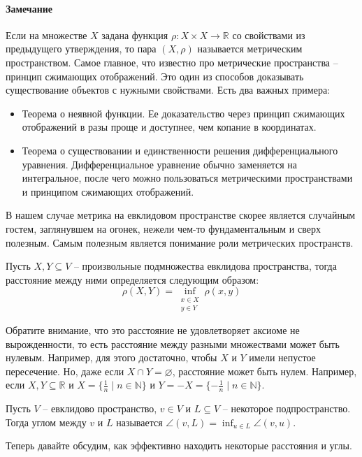 \paragraph{Замечание}

Если на множестве $X$ задана функция $\rho\colon X\times X\to \mathbb R$ со свойствами из предыдущего утверждения, то пара $(X,\rho)$ называется метрическим пространством. Самое главное, что известно про метрические пространства -- принцип сжимающих отображений. Это один из способов доказывать существование объектов с  нужными свойствами. Есть два важных примера:
\begin{itemize}
\item Теорема о неявной функции. Ее доказательство через принцип сжимающих отображений в разы проще и доступнее, чем копание в координатах.
\item Теорема о существовании и единственности решения дифференциального уравнения. Дифференциальное уравнение обычно заменяется на интегральное, после чего можно пользоваться метрическими пространствами и принципом сжимающих отображений.
\end{itemize}
В нашем случае метрика на евклидовом пространстве скорее является случайным гостем, заглянувшем на огонек, нежели чем-то фундаментальным и сверх полезным. Самым полезным является понимание роли метрических пространств.

\begin{definition}
Пусть $X,Y\subseteq V$ -- произвольные подмножества евклидова пространства, тогда расстояние между ними определяется следующим образом:
\[
\rho(X, Y) = \inf_{\substack{x\in X\\y\in Y}}\rho(x, y)
\]
\end{definition}
Обратите внимание, что это расстояние не удовлетворяет аксиоме не вырожденности, то есть расстояние между разными множествами может быть нулевым. Например, для этого достаточно, чтобы $X$ и $Y$ имели непустое пересечение. Но, даже если $X\cap Y = \varnothing$, расстояние может быть нулем. Например, если $X, Y \subseteq \mathbb R$ и $X = \{\frac{1}{n}\mid n\in \mathbb N\}$ и $Y = - X = \{-\frac{1}{n}\mid n\in \mathbb N\}$.

\begin{definition}
Пусть $V$ -- евклидово пространство, $v\in V$ и $L\subseteq V$ -- некоторое подпространство. Тогда углом между $v$ и $L$ называется $\angle (v, L) = \inf_{u\in L}\angle (v,u)$.
\end{definition}

Теперь давайте обсудим, как эффективно находить некоторые расстояния и углы.

